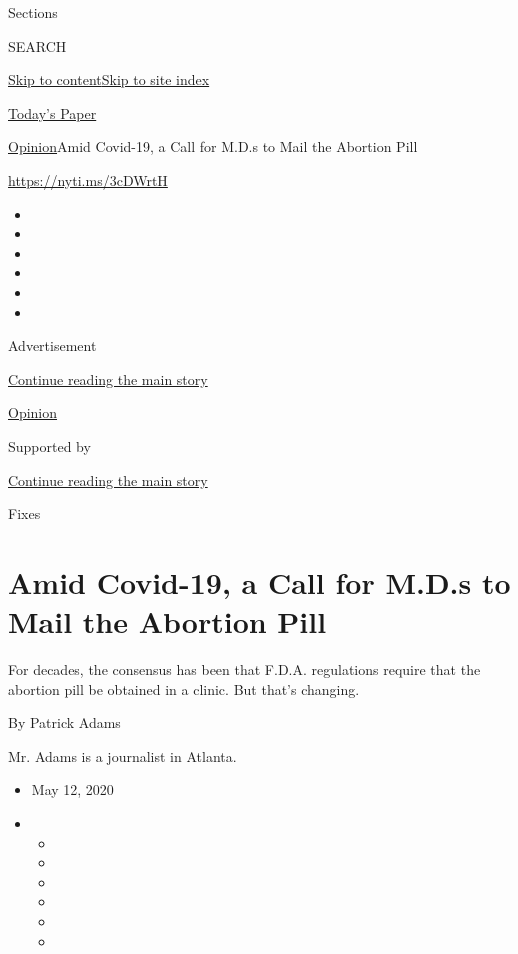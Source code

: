 Sections

SEARCH

\protect\hyperlink{site-content}{Skip to
content}\protect\hyperlink{site-index}{Skip to site index}

\href{https://myaccount.nytimes3xbfgragh.onion/auth/login?response_type=cookie\&client_id=vi}{}

\href{https://www.nytimes3xbfgragh.onion/section/todayspaper}{Today's
Paper}

\href{/section/opinion}{Opinion}\textbar{}Amid Covid-19, a Call for
M.D.s to Mail the Abortion Pill

\url{https://nyti.ms/3cDWrtH}

\begin{itemize}
\item
\item
\item
\item
\item
\item
\end{itemize}

Advertisement

\protect\hyperlink{after-top}{Continue reading the main story}

\href{/section/opinion}{Opinion}

Supported by

\protect\hyperlink{after-sponsor}{Continue reading the main story}

Fixes

\hypertarget{amid-covid-19-a-call-for-mds-to-mail-the-abortion-pill}{%
\section{Amid Covid-19, a Call for M.D.s to Mail the Abortion
Pill}\label{amid-covid-19-a-call-for-mds-to-mail-the-abortion-pill}}

For decades, the consensus has been that F.D.A. regulations require that
the abortion pill be obtained in a clinic. But that's changing.

By Patrick Adams

Mr. Adams is a journalist in Atlanta.

\begin{itemize}
\item
  May 12, 2020
\item
  \begin{itemize}
  \item
  \item
  \item
  \item
  \item
  \item
  \end{itemize}
\end{itemize}

